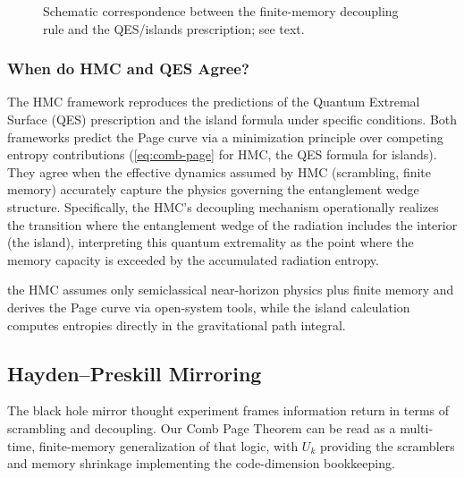 \documentclass[11pt,a4paper]{article}
\newcommand{\HMC}{\textsc{HMC}\xspace}
\theoremstyle{plain}
\theoremstyle{definition}
\theoremstyle{remark}
\begin{document}
\begin{figure}[t]
\centering
{}
\caption{Schematic correspondence between the finite-memory decoupling rule and the QES/islands prescription; see text.}
\label{fig:decoupling-qes}
\end{figure}

\subsubsection{When do HMC and QES Agree?}
The \HMC{} framework reproduces the predictions of the Quantum Extremal Surface (QES) prescription and the island formula under specific conditions. Both frameworks predict the Page curve via a minimization principle over competing entropy contributions (\eqref{eq:comb-page} for \HMC{}, the QES formula for islands). They agree when the effective dynamics assumed by \HMC{} (scrambling, finite memory) accurately capture the physics governing the entanglement wedge structure. Specifically, the \HMC{}'s decoupling mechanism operationally realizes the transition where the entanglement wedge of the radiation includes the interior (the island), interpreting this quantum extremality as the point where the memory capacity is exceeded by the accumulated radiation entropy.


the \HMC{} assumes only semiclassical near-horizon physics plus finite memory and derives the Page curve via open-system tools,
while the island calculation computes entropies directly in the gravitational path integral.

\subsection{Hayden--Preskill Mirroring}
The black hole mirror thought experiment \cite{Hayden:2007} frames information return in terms of scrambling and decoupling.
Our Comb Page Theorem can be read as a multi-time, finite-memory generalization of that logic, with $U_k$ providing the scramblers
and memory shrinkage implementing the code-dimension bookkeeping.
\end{document}
